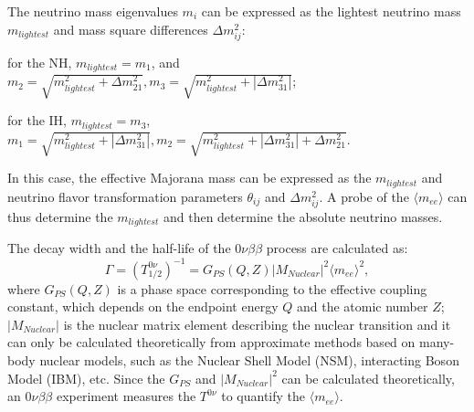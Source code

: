 The neutrino mass eigenvalues $m_i$ can be expressed as the lightest neutrino mass $m_{lightest}$ and mass square differences $\Delta m^2_{ij}$\cite{suekane2015neutrino}:

for the NH, $m_{lightest}=m_1$, and $m_2=\sqrt{m_{lightest}^2+\Delta m^2_{21}}, m_3 = \sqrt{m_{lightest}^2+|\Delta m^2_{31}|}$;

for the IH, $m_{lightest}=m_3$, $m_1=\sqrt{m_{lightest}^2+|\Delta m^2_{31}|}, m_2=\sqrt{m_{lightest}^2+|\Delta m^2_{31}|+\Delta m^2_{21}}$.

In this case, the effective Majorana mass can be expressed as the $m_{lightest}$ and neutrino flavor transformation parameters $\theta_{ij}$ and $\Delta m^2_{ij}$. A probe of the $\langle m_{ee}\rangle$ can thus determine the $m_{lightest}$ and then determine the absolute neutrino masses. 

The decay width and the half-life of the $0\nu\beta\beta$ process are calculated as\cite{suekane2015neutrino,zuber2020neutrino}:
\begin{equation}\label{eq:decayWidth0vbb}
\Gamma=(T^{0\nu}_{1/2})^{-1} = G_{PS}(Q,Z)|M_{Nuclear}|^2\langle m_{ee}\rangle^2, 
\end{equation}
where $G_{PS}(Q,Z)$ is a phase space corresponding to the effective coupling constant, which depends on the endpoint energy $Q$ and the atomic number $Z$; $|M_{Nuclear}|$ is the nuclear matrix element describing the nuclear transition and it can only be calculated theoretically from approximate methods based on many-body nuclear models, such as the Nuclear Shell Model (NSM), interacting Boson Model (IBM), etc. Since the $G_{PS}$ and $|M_{Nuclear}|^2$ can be calculated theoretically, an $0\nu\beta\beta$ experiment measures the $T^{0\nu}$ to quantify the $\langle m_{ee}\rangle$.

